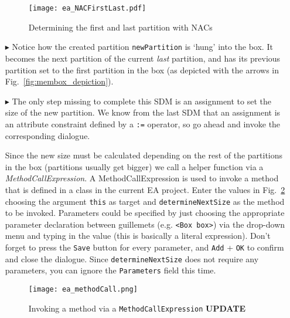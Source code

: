\begin{itemize}
\begin{figure}[htbp]
\begin{center}
  \texttt{[image: ea\_NACFirstLast.pdf]} 
  \caption{Determining the first and last partition with NACs}  
  \label{fig:sdm_grow_3}
\end{center}
\end{figure}
 
\item[$\blacktriangleright$] Notice how the created partition \texttt{newPartition} is `hung' into the box. It becomes the next partition of the current
\emph{last} partition, and has its previous partition set to the first partition in the box (as depicted with the arrows in Fig.~\ref{fig:membox_depiction}).
  
\item[$\blacktriangleright$] The only step missing to complete this SDM is an assignment to set the size of the new partition. We know from the last SDM that an
assignment is an attribute constraint defined by a \texttt{:=} operator, so go ahead and invoke the corresponding dialogue. 

Since the new size must be calculated
depending on the rest of the partitions in the box (partitions usually get bigger) we call a helper function  via a
\emph{MethodCallExpression}. A MethodCallExpression is used to invoke a method that is defined in a class in the current EA project. Enter the values in
Fig.~\ref{fig:sdm_grow_4} choosing the argument \texttt{this} as target and \texttt{determineNextSize} as the method to be invoked.
Parameters could be specified by just choosing the appropriate parameter declaration between guillemets (e.g. \texttt{<Box box>}) via the drop-down menu and
typing in the value (this is basically a literal expression). Don't forget to press the \texttt{Save} button for every parameter, and \texttt{Add} + \texttt{OK}
to confirm and close the dialogue. Since \texttt{determineNextSize} does not require any parameters, you can ignore the \texttt{Parameters} field this time.
 
\begin{figure}[htbp]
\begin{center}
  \texttt{[image: ea\_methodCall.png]}
  \caption{Invoking a method via a \texttt{MethodCallExpression} {\bf UPDATE}}  
  \label{fig:sdm_grow_4} 
\end{center}
\end{figure}
\FloatBarrier


\end{itemize}
